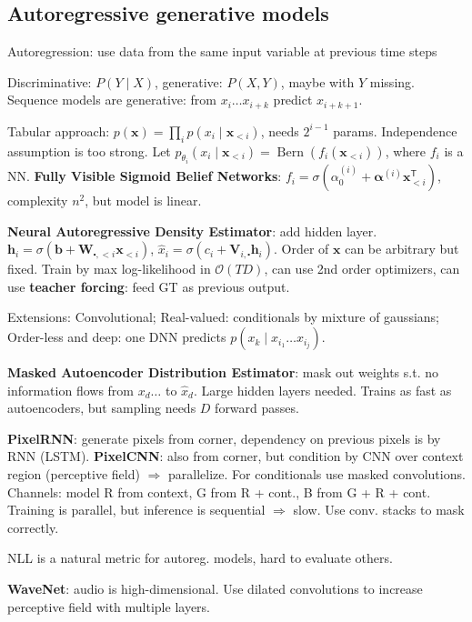 \documentclass[11pt,landscape,a4paper,fleqn]{article}
\newcommand*{\tran}{^{\mathsf{T}}} %
\def\myvector#1{\mathbf{#1}}
\def\vb{{\myvector{b}}}
\def\vh{{\myvector{h}}}
\def\vx{{\myvector{x}}}
\def\mymatrix#1{\mathbf{#1}}
\def\mV{{\mymatrix{V}}}
\def\mW{{\mymatrix{W}}}
\begin{document}
\begin{multicols*}{4}
\section{Autoregressive generative models}

Autoregression: use data from the same input variable at previous time steps

Discriminative: $P(Y \mid X)$, generative: $P(X, Y)$, maybe with $Y$ missing.
Sequence models are generative: from $x_i \dots x_{i + k}$ predict $x_{i + k + 1}$.

Tabular approach: $p(\vx) = \prod_i p(x_i \mid \vx_{<i})$, needs $2^{i - 1}$ params.
Independence assumption is too strong.
Let $p_{\theta_i}(x_i \mid \vx_{ < i}) = \operatorname{Bern}(f_i(\vx_{ < i}))$,
where $f_i$ is a NN.
\textbf{Fully Visible Sigmoid Belief Networks}: $f_i = \sigma(\alpha^{(i)}_0 + \bm{\alpha}^{(i)} \vx_{ < i}\tran)$,
complexity $n^2$, but model is linear.

\textbf{Neural Autoregressive Density Estimator}: add hidden layer.
$\vh_i = \sigma(\vb + \mW_{\centerdot, < i} \vx_{ < i})$,
$\hat{x}_i = \sigma(c_i + \mV_{i,\centerdot} \vh_i)$.
Order of $\vx$ can be arbitrary but fixed.
Train by max log-likelihood in $\mathcal{O}(TD)$, can use 2nd order optimizers,
can use \textbf{teacher forcing}: feed GT as previous output.

Extensions: Convolutional; Real-valued: conditionals by mixture of gaussians;
Order-less and deep: one DNN predicts $p(x_k \mid x_{i_1} \dots x_{i_j})$.

\textbf{Masked Autoencoder Distribution Estimator}:
mask out weights s.t. no information flows from $x_d \dots $ to $\hat{x}_d$.
Large hidden layers needed.
Trains as fast as autoencoders, but sampling needs $D$ forward passes.

\textbf{PixelRNN}: generate pixels from corner, dependency on previous pixels is by RNN (LSTM).
\textbf{PixelCNN}: also from corner, but condition by CNN over context region (perceptive field) $ \Rightarrow $ parallelize.
For conditionals use masked convolutions.
Channels: model R from context, G from R + cont., B from G + R + cont.
Training is parallel, but inference is sequential $ \Rightarrow $ slow.
Use conv. stacks to mask correctly.

NLL is a natural metric for autoreg. models,
hard to evaluate others.

\textbf{WaveNet}: audio is high-dimensional.
Use dilated convolutions to increase perceptive field with multiple layers.


\end{multicols*}
\end{document}
